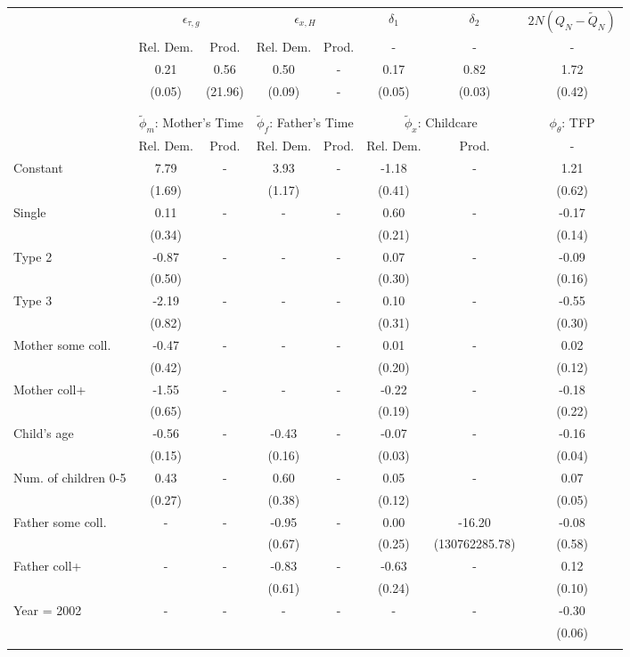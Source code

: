\begin{tabular}{lccccccc}\toprule
 & \multicolumn{2}{c}{$\epsilon_{\tau,g}$} & \multicolumn{2}{c}{$\epsilon_{x,H}$} & {$\delta_{1}$} & {$\delta_{2}$} & $2N(Q_{N} - \tilde{Q}_{N})$ \\
 & Rel. Dem. & Prod. & Rel. Dem. & Prod. & - & - & - \\\cmidrule(r){2-3}\cmidrule(r){4-5}\cmidrule(r){6-6}\cmidrule(r){7-7}\cmidrule(r){8-8}
&0.21&0.56&0.50& - &0.17&0.82&1.72\\
&(0.05)&(21.96)&(0.09)& - &(0.05)&(0.03)&(0.42)\\
\\
&&&&&&&\\
 & \multicolumn{2}{c}{$\tilde{\phi}_{m}$: Mother's Time} & \multicolumn{2}{c}{$\tilde{\phi}_{f}$: Father's Time} & \multicolumn{2}{c}{$\tilde{\phi}_{x}$: Childcare} &{$\phi_{\theta}$: TFP} \\
 & Rel. Dem. & Prod. & Rel. Dem. & Prod. & Rel. Dem. & Prod. & -  \\\cmidrule(r){2-3}\cmidrule(r){4-5}\cmidrule(r){6-7}\cmidrule(r){8-8}
Constant&7.79& -&3.93& -&-1.18& -&1.21\\
&(1.69)&&(1.17)&&(0.41)&&(0.62)\\
Single&0.11& -& - & -&0.60& -&-0.17\\
&(0.34)& & &&(0.21)&&(0.14)\\
Type 2&-0.87& -& - & -&0.07& -&-0.09\\
&(0.50)& & &&(0.30)&&(0.16)\\
Type 3&-2.19& -& - & -&0.10& -&-0.55\\
&(0.82)& & &&(0.31)&&(0.30)\\
Mother some coll.&-0.47& -& - & -&0.01& -&0.02\\
&(0.42)& & &&(0.20)&&(0.12)\\
Mother coll+&-1.55& -& - & -&-0.22& -&-0.18\\
&(0.65)& & &&(0.19)&&(0.22)\\
Child's age&-0.56& -&-0.43& -&-0.07& -&-0.16\\
&(0.15)&&(0.16)&&(0.03)&&(0.04)\\
Num. of children 0-5&0.43& -&0.60& -&0.05& -&0.07\\
&(0.27)&&(0.38)&&(0.12)&&(0.05)\\
Father some coll.& - & -&-0.95& -&0.00&-16.20&-0.08\\
 & &&(0.67)&&(0.25)&(130762285.78)&(0.58)\\
Father coll+& - & -&-0.83& -&-0.63& -&0.12\\
 & &&(0.61)&&(0.24)&&(0.10)\\
Year = 2002& - & -& - & -& - & -&-0.30\\
 & & & & & &&(0.06)\\
\\
\bottomrule\end{tabular}
